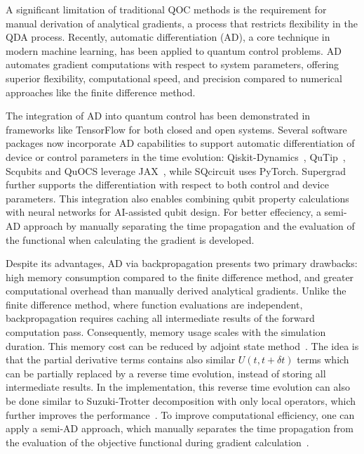 \documentclass[a4paper,onecolumn,11pt,unpublished]{quantumarticle}
\begin{document}
A significant limitation of traditional QOC methods is the requirement for manual derivation of analytical gradients, a process that restricts flexibility in the QDA process. Recently, automatic differentiation (AD)\cite{Baydin2018Automatic}, a core technique in modern machine learning, has been applied to quantum control problems. AD automates gradient computations with respect to system parameters, offering superior flexibility, computational speed, and precision compared to numerical approaches like the finite difference method.

The integration of AD into quantum control has been demonstrated in frameworks like TensorFlow\cite{Abadi2016TensorFlow} for both closed and open systems\cite{Abdelhafez2019Quantum,Abdelhafez2019Gradientbased,Abdelhafez2020Universal}.  Several software packages now incorporate AD capabilities to support automatic differentiation of device or control parameters in the time evolution: Qiskit-Dynamics~\cite{Puzzuoli2023Algorithms}, QuTip~\cite{Johansson2013QuTiP,Johansson2012QuTiP,Lambert2024QuTiP}, Scqubits\cite{Groszkowski2021Scqubits, Chitta2022Computeraided} and QuOCS\cite{Rossignolo2023QuOCS} leverage JAX~\cite{jax2018github}, while SQcircuit\cite{Rajabzadeh2024A} uses PyTorch\cite{Paszke2019PyTorch}.  Supergrad~\cite{Wang2025SuperGrad} further supports the differentiation with respect to both control and device parameters. This integration also enables combining qubit property calculations with neural networks for AI-assisted qubit design\cite{Rajabzadeh2024A}. For better effeciency, a semi-AD approach by manually separating the time propagation and the evaluation of the functional when calculating the gradient is developed\cite{Goerz2022Quantum}. 

Despite its advantages, AD via backpropagation presents two primary drawbacks: high memory consumption compared to the finite difference method, and greater computational overhead than manually derived analytical gradients. Unlike the finite difference method, where function evaluations are independent, backpropagation requires caching all intermediate results of the forward computation pass. Consequently, memory usage scales with the simulation duration. This memory cost can be reduced by adjoint state method~\cite{Blondel2024The}. The idea is that the partial derivative terms contains also similar $U(t, t+\delta t)$ terms which can be partially replaced by a reverse time evolution, instead of storing all intermediate results. In the implementation, this reverse time evolution can also be done similar to Suzuki-Trotter decomposition with only local operators, which further improves the performance~\cite{Wang2025SuperGrad}. To improve computational efficiency, one can apply a semi-AD approach, which manually separates the time propagation from the evaluation of the objective functional during gradient calculation~\cite{Goerz2022Quantum}.
\end{document}
